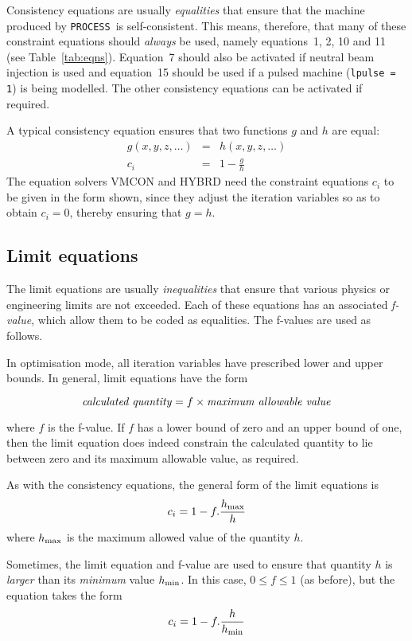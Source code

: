 \documentclass[11pt,a4paper]{report}
\newcommand{\process}{\mbox{\texttt{PROCESS}}}
\begin{document}
Consistency equations are usually \textit{equalities}\/ that ensure that the
machine produced by \process\ is self-consistent. This means, therefore, that many
of these constraint equations should \textit{always}\/ be used, namely
equations~1, 2, 10 and 11 (see Table~\ref{tab:eqns}).  Equation~7 should also
be activated if neutral beam injection is used and equation~15 should be used
if a pulsed machine (\texttt{lpulse = 1}) is being modelled.  The other
consistency equations can be activated if required.

A typical consistency equation ensures that two functions $g$ and $h$ are
equal:
\begin{eqnarray*}
g(x,y,z,\ldots) & = & h(x,y,z,\ldots) \\
c_i & = & 1 - \frac{g}{h}
\end{eqnarray*}
The equation solvers VMCON and HYBRD need the constraint equations $c_i$ to be
given in the form shown, since they adjust the iteration variables so as to
obtain $c_i = 0$, thereby ensuring that $g = h$.

\subsection{Limit equations}

The limit equations are usually \textit{inequalities}\/ that ensure that
various physics or engineering limits are not exceeded. Each of these
equations has an associated \textit{f-value}, which allow them to be coded as
equalities. The f-values are used as follows.

In optimisation mode, all iteration variables have prescribed lower and upper
bounds. In general, limit equations have the form

\[ \mbox{\textit{calculated quantity}} = f \times \mbox{\textit{maximum allowable
value}} \]

where $f$ is the f-value. If $f$ has a lower bound of zero and an upper bound
of one, then the limit equation does indeed constrain the calculated quantity
to lie between zero and its maximum allowable value, as required.

As with the consistency equations, the general form of the limit equations is
\[ c_i = 1 - f.\frac{h_{\mbox{\scriptsize max}}}{h} \]
where $h_{\mbox{\scriptsize max}}$ is the maximum allowed value of the quantity $h$.

Sometimes, the limit equation and f-value are used to ensure that quantity $h$
is \textit{larger}\/ than its \textit{minimum}\/ value $h_{\mbox{\scriptsize min}}$. In
this case, $0 \leq f \leq 1$ (as before), but the equation takes the form
\[ c_i = 1 - f.\frac{h}{h_{\mbox{\scriptsize min}}} \]
\end{document}
